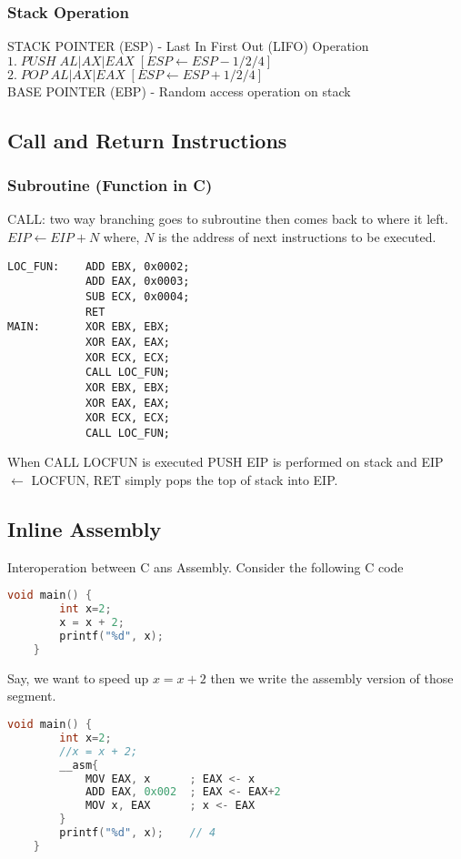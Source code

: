 \documentclass[12pt,a4paper]{article}
\begin{document}
\subsubsection{Stack Operation}
STACK POINTER (ESP) - Last In First Out (LIFO) Operation\\
$1.\; PUSH \;AL|AX|EAX\; [ESP \leftarrow ESP -1/2/4]$ \\ 
$2.\; POP\; AL|AX|EAX\; [ESP \leftarrow ESP + 1/2/4]$  \\ 
BASE POINTER (EBP) - Random access operation on stack\\

\newpage
\subsection{Call and Return Instructions}
\subsubsection{Subroutine (Function in C)}
CALL: two way branching goes to subroutine then comes back to where it left.\\
$EIP \leftarrow EIP+N$ where, $N$ is the address of next instructions to be executed.
\begin{lstlisting}[language=Ant, caption=subroutine example]
LOC_FUN:	ADD EBX, 0x0002;
			ADD EAX, 0x0003;
			SUB ECX, 0x0004;
			RET
MAIN:		XOR EBX, EBX;
			XOR EAX, EAX;
			XOR ECX, ECX;
			CALL LOC_FUN; 
			XOR EBX, EBX;
			XOR EAX, EAX;
			XOR ECX, ECX;
			CALL LOC_FUN; 		
\end{lstlisting}
When CALL LOC\textunderscore FUN is executed PUSH EIP is performed on stack and EIP $\leftarrow$ LOC\textunderscore FUN, RET simply pops the top of stack into EIP.

\subsection{Inline Assembly}
Interoperation between C ans Assembly. Consider the following C code
\begin{lstlisting}[language=C, caption=Inline Example]
	void main() {
		int x=2;
		x = x + 2;
		printf("%d", x);
	}
\end{lstlisting}
Say, we want to speed up $x = x + 2$ then we write the assembly version of those segment.
\begin{lstlisting}[language=C, caption=Inline Example]
	void main() {
		int x=2;
		//x = x + 2;
		__asm{
			MOV EAX, x		; EAX <- x
			ADD EAX, 0x002	; EAX <- EAX+2
			MOV x, EAX		; x <- EAX
		}
		printf("%d", x);	// 4
	}
\end{lstlisting}
\end{document}
